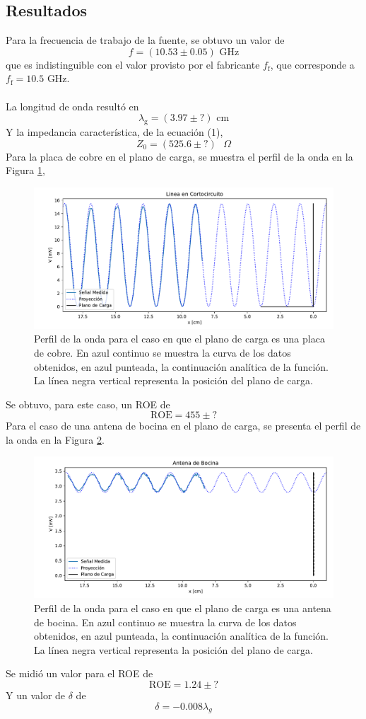 \documentclass[11pt,a4paper]{article}
\begin{document}
\begin{multicols}{2}
\section{Resultados}
Para la frecuencia de trabajo de la fuente, se obtuvo un valor de 
$$
f = (10.53 \pm 0.05) \text{ GHz}
$$
que es indistinguible con el valor provisto por el fabricante $f_\text{f}$, que corresponde a $f_\text{f}=10.5$ GHz. \\ \\
La longitud de onda resultó en
$$
\lambda_\text{g} = (3.97 \pm ?) \text{ cm} 
$$
Y la impedancia característica, de la ecuación (1),
$$
Z_0 = (525.6 \pm ?) \text{ } \Omega
$$
Para la placa de cobre en el plano de carga, se muestra el perfil de la onda en la Figura \ref{fig:cortocir}, 
\begin{figure}[H]
    \centering
    \includegraphics[width=\linewidth]{Images/lineacc.pdf}
    \caption{Perfil de la onda para el caso en que el plano de carga es una placa de cobre. En azul continuo se muestra la curva de los datos obtenidos, en azul punteada, la continuación analítica de la función. La línea negra vertical representa la posición del plano de carga.}
    \label{fig:cortocir}
\end{figure}
Se obtuvo, para este caso, un ROE de
$$
\text{ROE} = 455\pm?
$$
Para el caso de una antena de bocina en el plano de carga, se presenta el perfil de la onda en la Figura \ref{fig:bocina}.
\begin{figure}[H]
    \centering
    \includegraphics[width=\linewidth]{Images/antena_bocina.pdf}
    \caption{Perfil de la onda para el caso en que el plano de carga es una antena de bocina. En azul continuo se muestra la curva de los datos obtenidos, en azul punteada, la continuación analítica de la función. La línea negra vertical representa la posición del plano de carga.}
    \label{fig:bocina}
\end{figure}
Se midió un valor para el ROE de
$$
\text{ROE} = 1.24\pm?
$$
Y un valor de $\delta$ de
$$
\delta = -0.008\lambda_g
$$

\end{multicols}
\end{document}
